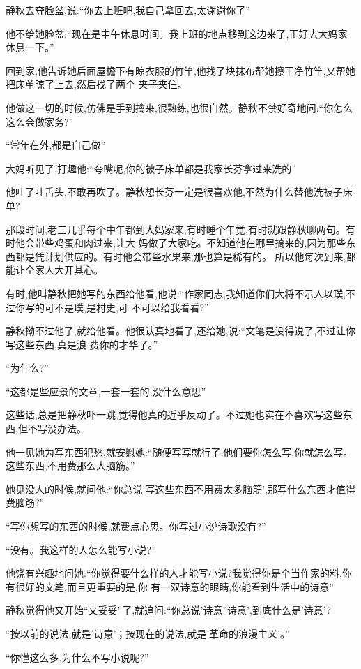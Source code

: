 ﻿\documentclass[12pt]{article}
\begin{document}
静秋去夺脸盆,说:``你去上班吧,我自己拿回去,太谢谢你了\myrule ''

他不给她脸盆:``现在是中午休息时间。我上班的地点移到这边来了,正好去大妈家休息一下。''

回到家,他告诉她后面屋檐下有晾衣服的竹竿,他找了块抹布帮她擦干净竹竿,又帮她把床单晾了上去,然后找了两个
夹子夹住。

他做这一切的时候,仿佛是手到擒来,很熟练,也很自然。静秋不禁好奇地问:``你\myrule 怎么这么会做家务?''

``常年在外,都是自己做\myrule ''

大妈听见了,打趣他:``夸嘴呢,你的被子床单都是我家长芬拿过来洗的\myrule ''

他吐了吐舌头,不敢再吹了。静秋想长芬一定是很喜欢他,不然为什么替他洗被子床单?

那段时间,老三几乎每个中午都到大妈家来,有时睡个午觉,有时就跟静秋聊两句。有时他会带些鸡蛋和肉过来,让大
妈做了大家吃。不知道他在哪里搞来的,因为那些东西都是凭计划供应的。有时他会带些水果来,那也算是稀有的。
所以他每次到来,都能让全家人大开其心。

有时,他叫静秋把她写的东西给他看,他说:``作家同志,我知道你们大将不示人以璞,不过你写的可不是璞,是村史,可
不可以给我看看?''

静秋拗不过他了,就给他看。他很认真地看了,还给她,说:``文笔是没得说了,不过让你写这些东西,真是\myrule 浪
费你的才华了。''

``为什么?''

``这\myrule 都是些应景的文章,一套一套的,没什么意思\myrule ''

这些话,总是把静秋吓一跳,觉得他真的近乎反动了。不过她也实在不喜欢写这些东西,但不写没办法。

他一见她为写东西犯愁,就安慰她:``随便写写就行了,他们要你怎么写,你就怎么写。这些东西,不用费那么大脑筋。''

她见没人的时候,就问他:``你总说'写这些东西不用费太多脑筋',那写什么东西才值得费脑筋?''

``写你想写的东西的时候,就费点心思。你写过小说诗歌没有?''

``没有。我这样的人怎么能写小说?''

他饶有兴趣地问她:``你觉得要什么样的人才能写小说?我觉得你是个当作家的料,你有很好的文笔,而且更重要的是,你
有一双诗意的眼睛,你能看到生活中的诗意\myrule ''

静秋觉得他又开始``文妥妥''了,就追问:``你总说'诗意''诗意',到底什么是'诗意'?

``按以前的说法,就是'诗意'；按现在的说法,就是'革命的浪漫主义'。''

``你懂这么多,为什么不写小说呢?''
\end{document}
